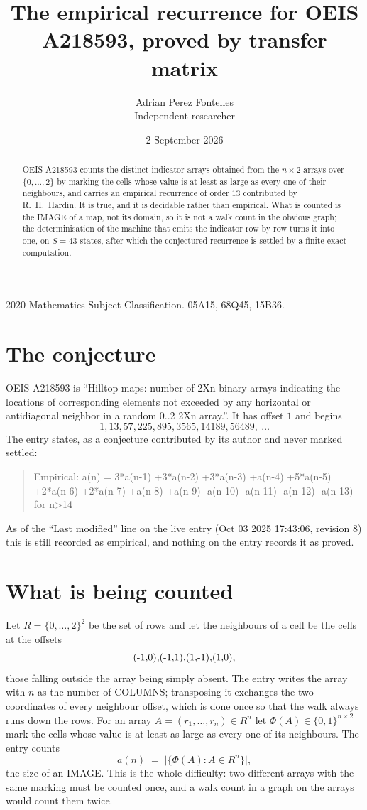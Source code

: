 \documentclass[11pt,a4paper]{article}
\title{The empirical recurrence for OEIS A218593, proved by transfer matrix}
\author{Adrian Perez Fontelles\\ \small Independent researcher}
\date{2 September 2026}
\theoremstyle{plain}
\theoremstyle{definition}
\begin{document}
\maketitle

\begin{abstract}
OEIS A218593 counts the distinct indicator arrays obtained from the $n\times2$ arrays over
$\{0,\dots,2\}$ by marking the cells whose value is at least as large as every one of their neighbours, and carries an
empirical recurrence of order $13$ contributed by R.~H.~Hardin. It is true, and it is
decidable rather than empirical. What is counted is the IMAGE of a map, not its domain, so it
is not a walk count in the obvious graph; the determinisation of the machine that emits the
indicator row by row turns it into one, on $S=43$ states, after which the conjectured
recurrence is settled by a finite exact computation.
\end{abstract}

\noindent\small 2020 Mathematics Subject Classification. 05A15, 68Q45, 15B36.\normalsize

\section{The conjecture}

OEIS A218593 is ``Hilltop maps: number of 2Xn binary arrays indicating the locations of corresponding elements not exceeded by any horizontal or antidiagonal neighbor in a random 0..2 2Xn array.''. It has offset $1$ and begins
\[
1, 13, 57, 225, 895, 3565, 14189, 56489,\ \dots
\]
The entry states, as a conjecture contributed by its author and never marked settled:
\begin{quote}
Empirical: a(n) = 3*a(n-1) +3*a(n-2) +3*a(n-3) +a(n-4) +5*a(n-5) +2*a(n-6) +2*a(n-7) +a(n-8) +a(n-9) -a(n-10) -a(n-11) -a(n-12) -a(n-13) for n>14
\end{quote}
As of the ``Last modified'' line on the live entry (Oct 03 2025 17:43:06, revision 8) this is still
recorded as empirical, and nothing on the entry records it as proved.

\section{What is being counted}

Let $R=\{0,\dots,2\}^{2}$ be the set of rows and let the neighbours of a cell be the
cells at the offsets
\[
$(-1,0)$, $(-1,1)$, $(1,-1)$, $(1,0)$,
\]
those falling outside the array being simply absent. The entry writes the array with $n$ as the number of COLUMNS; transposing it exchanges the two coordinates of every neighbour offset, which is done once so that the walk always runs down the rows. For an array
$A=(r_1,\dots,r_n)\in R^n$ let $\Phi(A)\in\{0,1\}^{n\times2}$ mark the cells whose value
is at least as large as every one of its neighbours. The entry counts
\[
a(n)\;=\;\bigl|\{\Phi(A):A\in R^n\}\bigr| ,
\]
the size of an IMAGE. This is the whole difficulty: two different arrays with the same marking
must be counted once, and a walk count in a graph on the arrays would count them twice.
\end{document}
